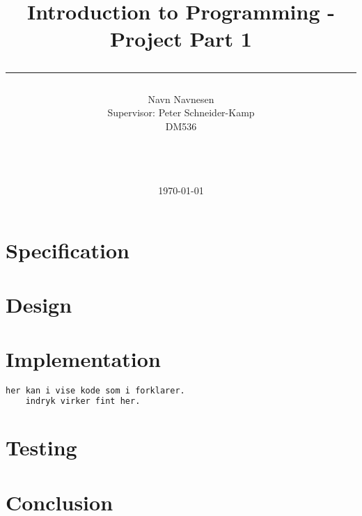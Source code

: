 \documentclass[a4paper,10pt]{article}
\title{Introduction to Programming - Project Part 1 \\\rule{10cm}{0.5mm}}
\author{Navn Navnesen 
\\Supervisor: Peter Schneider-Kamp\\ DM536\\\rule{5.5cm}{0.5mm}\\}
\date{\today}
\begin{document}
\maketitle

\vfill

\tableofcontents

\newpage
\section{Specification} 

\section{Design}
\section{Implementation}


\begin{lstlisting}[language=python]
her kan i vise kode som i forklarer.
	indryk virker fint her.
\end{lstlisting}


\section{Testing}

\begin{comment}
I testing skal i forklare jeres tests osv. udover det kan i have et billede med
som i kan tilfÃ¸je ved at kopiere includegraphics som herunder.

\begin{figure}[H]\center
 \texttt{[image: billede.png]}
 \caption{}
\end{figure}

udskift billede.png med jeres billede fil som skal ligge i samme mappe som .tex
i kan Ã¦ndre pÃ¥ scale for at ÃƒÂ¦ndre pÃƒÂ¥ billede stÃ¸rrelse i pdfen.
\end{comment}


\section{Conclusion} 

\end{document}
